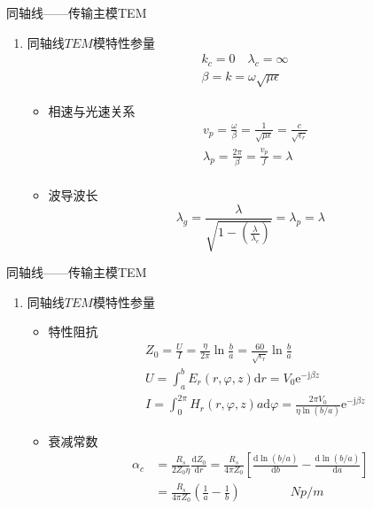 \begin{frame}{同轴线——传输主模TEM}
    \begin{enumerate}
        \resume
        \item 同轴线$TEM$模特性参量
        \begin{align*}
            &k_c=0\quad \lambda_c=\infty\\
            &\beta=k=\omega\sqrt{\mu\epsilon}
        \end{align*}
        \begin{itemize}
            \item 相速与光速关系\\
            \begin{align*}
                &v_p=\frac{\omega}{\beta}=\frac{1}{\sqrt{\mu\epsilon}}=\frac{c}{\sqrt{\epsilon_r}}\\
                &\lambda_p=\frac{2\pi}{\beta}=\frac{v_p}{f}=\lambda\\
            \end{align*}
            \item 波导波长\\
            $$\lambda_g=\frac{\lambda}{\sqrt{1-\left(\frac{\lambda}{\lambda_c}\right)}}=\lambda_p=\lambda$$
        \end{itemize}
    \end{enumerate}
\end{frame}

\begin{frame}{同轴线——传输主模TEM}
    \begin{enumerate}
        \resume
        \item 同轴线$TEM$模特性参量
        \begin{itemize}
            \item 特性阻抗
            \begin{align*}
                &Z_0=\frac{U}{I}=\frac{\eta}{2\pi}\ln\frac{b}{a}=\frac{60}{\sqrt{\epsilon_r}}\ln\frac{b}{a}\\
                &U=\int_a^b E_r(r,\varphi,z)\mathrm{d}r=V_0\mathrm{e}^{-\mathrm{j}\beta z}\\
                &I=\int_0^{2\pi} H_r(r,\varphi,z)a\mathrm{d}\varphi=\frac{2\pi V_0}{\eta\ln(b/a)}\mathrm{e}^{-\mathrm{j}\beta z}
            \end{align*}
            \item 衰减常数
            \begin{align*}
                \alpha_c&=\frac{R_s}{2Z_0\eta}\frac{\mathrm{d}Z_0}{\mathrm{d}r}=\frac{R_s}{4\pi Z_0}\left[\frac{\mathrm{d}\ln(b/a)}{\mathrm{d}b}-\frac{\mathrm{d}\ln(b/a)}{\mathrm{d}a}\right]\\
                        &=\frac{R_s}{4\pi Z_0}\left(\frac{1}{a}-\frac{1}{b}\right)\qquad\qquad Np/m
            \end{align*}
        \end{itemize}
    \end{enumerate}
\end{frame}

